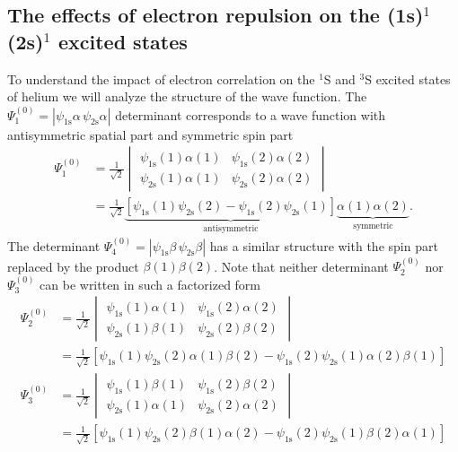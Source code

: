 \documentclass[../Main/chem331-notes.tex]{subfiles}
\begin{document}
\subsection{The effects of electron repulsion on the (1s)$^1$(2s)$^1$ excited states}
To understand the impact of electron correlation on the $^1$S and $^3$S excited states of helium we will analyze the structure of the wave function.
The $\Psi_1^{(0)} = |\psi_\mathrm{1s} \alpha \, \psi_\mathrm{2s}  \alpha|$ determinant corresponds to a wave function with antisymmetric spatial part and symmetric spin part
\begin{equation}
\begin{split}
\Psi_1^{(0)} & = 
 \frac{1}{\sqrt{2}}
\begin{vmatrix}
\psi_\mathrm{1s}(1) \alpha(1) & \psi_\mathrm{1s}(2) \alpha(2)  \\
\psi_\mathrm{2s}(1) \alpha(1) & \psi_\mathrm{2s}(2) \alpha(2)
\end{vmatrix} \\
& = 
\frac{1}{\sqrt{2}} 
\underbrace{
\left[
\psi_\mathrm{1s}(1)
\psi_\mathrm{2s}(2)
-
\psi_\mathrm{1s}(2)
\psi_\mathrm{2s}(1)
\right]
}_{\textrm{antisymmetric}}
\underbrace{
\alpha(1)\alpha(2)
}_{\textrm{symmetric}}.
\end{split}
\end{equation}
The determinant $\Psi_4^{(0)} = |\psi_\mathrm{1s} \beta \, \psi_\mathrm{2s}  \beta|$ has a similar structure with the spin part replaced by the product $\beta(1)\beta(2)$.
Note that neither determinant $\Psi_2^{(0)}$ nor $\Psi_3^{(0)}$ can be written in such a factorized form 
\begin{equation}
\begin{split}
\Psi_2^{(0)} & = 
 \frac{1}{\sqrt{2}}
\begin{vmatrix}
\psi_\mathrm{1s}(1) \alpha(1) & \psi_\mathrm{1s}(2) \alpha(2)  \\
\psi_\mathrm{2s}(1) \beta(1) & \psi_\mathrm{2s}(2) \beta(2)
\end{vmatrix} \\
& = 
\frac{1}{\sqrt{2}} 
\left[
\psi_\mathrm{1s}(1)
\psi_\mathrm{2s}(2)
\alpha(1)\beta(2)
-
\psi_\mathrm{1s}(2)
\psi_\mathrm{2s}(1)
\alpha(2)\beta(1)
\right]
\end{split}
\end{equation}
\begin{equation}
\begin{split}
\Psi_3^{(0)} & = 
 \frac{1}{\sqrt{2}}
\begin{vmatrix}
\psi_\mathrm{1s}(1) \beta(1) & \psi_\mathrm{1s}(2) \beta(2)  \\
\psi_\mathrm{2s}(1) \alpha(1) & \psi_\mathrm{2s}(2) \alpha(2)
\end{vmatrix} \\
& = 
\frac{1}{\sqrt{2}} 
\left[
\psi_\mathrm{1s}(1)
\psi_\mathrm{2s}(2)
\beta(1)\alpha(2)
-
\psi_\mathrm{1s}(2)
\psi_\mathrm{2s}(1)
\beta(2)\alpha(1)
\right]
\end{split}
\end{equation}
\end{document}
